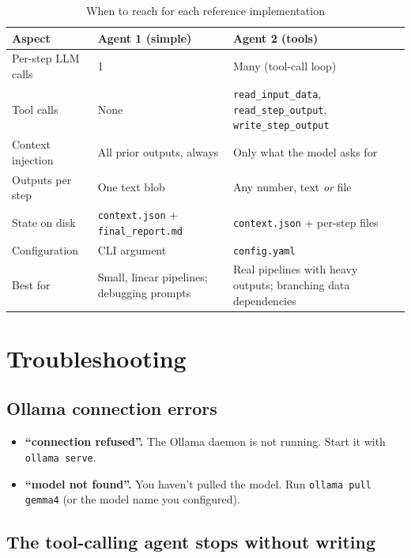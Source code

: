 \documentclass[12pt, a4paper]{article}
\begin{document}
\begin{table}[h]
\centering
\renewcommand{\arraystretch}{1.4}
\begin{tabularx}{\textwidth}{lXX}
\toprule
\textbf{Aspect} & \textbf{Agent 1 (simple)} & \textbf{Agent 2 (tools)} \\
\midrule
Per-step LLM calls & 1 & Many (tool-call loop) \\
Tool calls         & None & \texttt{read\_input\_data}, \texttt{read\_step\_output}, \texttt{write\_step\_output} \\
Context injection  & All prior outputs, always & Only what the model asks for \\
Outputs per step   & One text blob & Any number, text \textit{or} file \\
State on disk      & \texttt{context.json} + \texttt{final\_report.md} & \texttt{context.json} + per-step files \\
Configuration      & CLI argument & \texttt{config.yaml} \\
Best for           & Small, linear pipelines; debugging prompts & Real pipelines with heavy outputs; branching data dependencies \\
\bottomrule
\end{tabularx}
\caption{When to reach for each reference implementation}
\end{table}

\section{Troubleshooting}

\subsection{Ollama connection errors}

\begin{itemize}[leftmargin=1.5em]
  \item \textbf{``connection refused''.} The Ollama daemon is not running. Start it with \texttt{ollama serve}.
  \item \textbf{``model not found''.} You haven't pulled the model. Run \texttt{ollama pull gemma4} (or the model name you configured).
\end{itemize}

\subsection{The tool-calling agent stops without writing}
\end{document}
